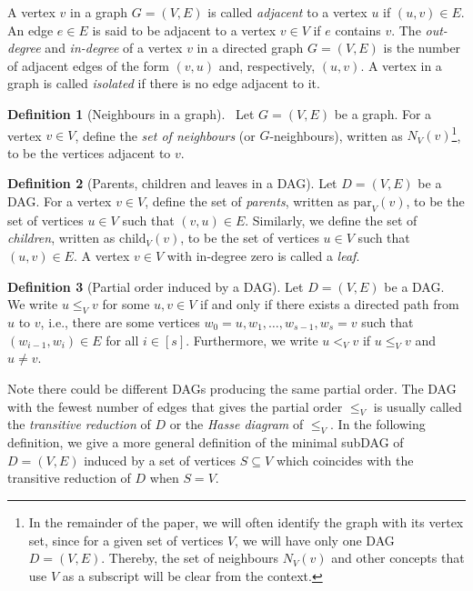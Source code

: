 \documentclass[11pt]{article}
\newcommand{\parent}[2]{\mathrm{par}_{#1}\left(#2\right)}
\newcommand{\child}[2]{\mathrm{child}_{#1}\left(#2\right)}
\theoremstyle{plain}
\theoremstyle{definition}
\newtheorem{definition}{Definition}
\numberwithin{definition}{section}
\numberwithin{lemma}{section}
\numberwithin{ass}{section}
\numberwithin{remark}{section}
\numberwithin{example}{section}
\numberwithin{proposition}{section}
\numberwithin{theorem}{section}
\begin{document}
A vertex $v$ in a graph ${G}=(V,E)$ is called \textit{adjacent} to a vertex $u$ if $(u,v)\in E$. An edge $e\in E$ is said to be adjacent to a vertex $v\in V$ if $e$ contains $v$. The \textit{out-degree} and \textit{in-degree} of a vertex $v$ in a directed graph $G=(V,E)$ is the number of adjacent edges of the form $(v,u)$ and, respectively, $(u,v)$. A vertex in a graph is called \textit{isolated} if there is no edge adjacent to it.
\begin{definition}[Neighbours in a graph]~\label{def: neighbours in graph}
Let ${G}=(V,E)$ be a graph. For a vertex $v\in V$, define the \emph{set of neighbours} (or ${G}$-neighbours), written as $N_{{V}}(v)$\footnote{In the remainder of the paper, we will often identify the graph with its vertex set, since for a given set of vertices $V$, we will have only one DAG $D=(V,E)$. Thereby, the set of neighbours $N_{{V}}(v)$ and other concepts that use $V$ as a subscript will be clear from the context.}, to be the vertices adjacent to $v$. 
\end{definition}
\begin{definition}[Parents, children and leaves in a DAG]
Let ${D}=(V,E)$ be a DAG. For a vertex $v\in V$, define the set of \emph{parents}, written as $\parent{V}{v}$, to be the set of vertices $u\in V$ such that $(v,u)\in E$. Similarly, we define the set of \emph{children}, written as $\child{V}{v}$, to be the set of vertices $u\in V$ such that $(u,v)\in E$. A vertex $v\in V$ with in-degree zero is called a \emph{leaf}. 
\end{definition}

\begin{definition}[Partial order induced by a DAG]
Let ${D}=(V,E)$ be a DAG. We write $u\le_{{V}} v$  for some $u,v\in V$ if and only if there exists a directed path from $u$ to $v$, i.e., there are some vertices $w_0=u,w_1,\ldots,w_{s-1},w_s=v$ such that  $(w_{i-1},w_{i})\in E$ for all $i\in[s]$.  Furthermore, we write $u<_{{V}}v$ if $u\le_{{V}} v$ and $u\neq v$.
\end{definition}
Note there could be different DAGs producing the same partial order. The DAG with the fewest number of edges that gives the partial order $\le_{{V}}$ is usually called the \emph{transitive reduction} of ${D}$ or the \emph{Hasse diagram} of $\le_{{V}}$. In the following definition, we give a more general definition of the minimal subDAG of ${D}=(V,E)$ induced by a set of vertices $S\subseteq V$ which coincides with the transitive reduction of ${D}$ when $S=V$. 
\end{document}
